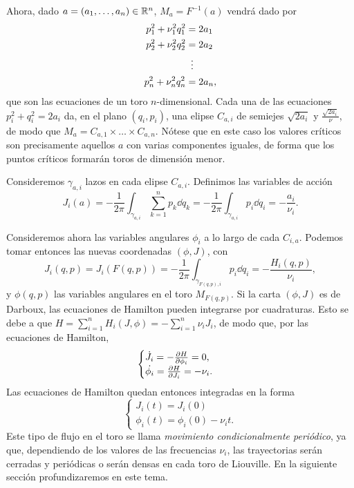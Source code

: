   Ahora, dado $a=(a_1,\dots,a_n)\in \mathbb{R}^n$, $M_a=F^{-1}(a)$ vendrá dado por 
  \begin{align*}[left=\empheqlbrace]
      p_1^2+\nu_1^2q_1^2&=2a_1 \\
      p_2^2+\nu_2^2q_2^2&=2a_2 \\
      & \vdotswithin{=} \\
p_n^2+\nu_n^2q_n^2&=2a_n, 
  \end{align*}
  que son las ecuaciones de un toro $n$-dimensional. Cada una de las ecuaciones $p_i^2+q_i^2=2a_i$ da, en el plano $(q_i,p_i)$, una elipse $C_{a,i}$ de semiejes $\sqrt{2a_i}$ y $\frac{\sqrt{2a_i}}{\nu}$, de modo que $M_a=C_{a,1}\times\dots\times C_{a,n}$. Nótese que en este caso los valores críticos son precisamente aquellos $a$ con varias componentes iguales, de forma que los puntos críticos formarán toros de dimensión menor.

  Consideremos $\gamma_{a,i}$ lazos en cada elipse $C_{a,i}$. Definimos las variables de acción 
  \begin{equation*}
    J_i(a) = -\frac{1}{2\pi}\int_{\gamma_{a,i}}\sum_{k=1}^n  p_k \dd q_k=-\frac{1}{2\pi}\int_{\gamma_{a,i}}  p_i \dd q_i=-\frac{a_i}{\nu_i}.
  \end{equation*}

  Consideremos ahora las variables angulares $\phi_i$ a lo largo de cada $C_{i,a}$. Podemos tomar entonces las nuevas coordenadas $(\phi,J)$, con
  \begin{equation*}
    J_i(q,p)=J_i(F(q,p))=-\frac{1}{2\pi}\int_{\gamma_{F(q,p),i}} p_i \dd q_i= -\frac{H_i(q,p)}{\nu_i},
  \end{equation*}
  y $\phi(q,p)$ las variables angulares en el toro $M_{F(q,p)}$.
  Si la carta $(\phi,J)$ es de Darboux, las ecuaciones de Hamilton pueden integrarse por cuadraturas. Esto se debe a que $H=\sum_{i=1}^n H_i(J,\phi)=-\sum_{i=1}^n \nu_i J_i$, de modo que, por las ecuaciones de Hamilton,
\begin{equation*}
  \begin{cases}
  \dot{J_i}=-\frac{\partial H}{\partial \phi_i}=0,\\
  \dot{\phi_i}=\frac{\partial H}{\partial J_i} =- \nu_i.
  \end{cases}
\end{equation*}
 Las ecuaciones de Hamilton quedan entonces integradas en la forma
\begin{equation*}
  \begin{cases}
  J_i(t)=  J_i(0) \\
  \phi_i(t) =  \phi_i(0) - \nu_i t.
\end{cases}
\end{equation*}
Este tipo de flujo en el toro se llama \emph{movimiento condicionalmente periódico}, ya que, dependiendo de los valores de las frecuencias $\nu_i$, las trayectorias serán cerradas y periódicas o serán densas en cada toro de Liouville. En la siguiente sección profundizaremos en este tema.

